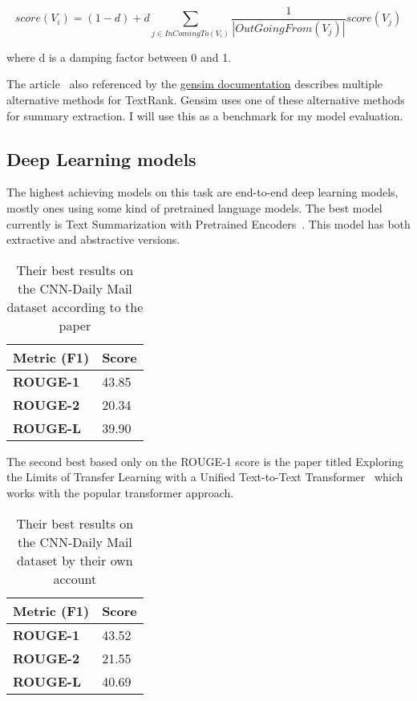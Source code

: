 \[score(V_i) = (1 - d) + d \sum_{j \in InComingTo(V_i)} \frac{1}{|OutGoingFrom(V_j)|} score(V_j)\]

where d is a damping factor between 0 and 1.

The article~\cite{TextRank} also referenced by the \href{https://radimrehurek.com/gensim/summarization/summariser.html}{gensim documentation} describes multiple alternative methods for TextRank. Gensim uses one of these alternative methods for summary extraction.
I will use this as a benchmark for my model evaluation.
\FloatBarrier

\subsection{Deep Learning models}

The highest achieving models on this task are end-to-end deep learning models, mostly ones using some kind of pretrained language models.
The best model currently is Text Summarization with Pretrained Encoders~\cite{BERTsum}. This model has both extractive and abstractive versions.

\begin{table}[!ht]
	\centering
	\begin{tabular}{| l | l |}
		\hline 
		\textbf{Metric (F1)}&\textbf{Score} \\ \hline \hline
		\textbf{ROUGE-1}&43.85 \\ \hline
		\textbf{ROUGE-2}&20.34 \\ \hline
		\textbf{ROUGE-L}&39.90 \\ \hline
	\end{tabular}
	\caption{Their best results on the CNN-Daily Mail dataset according to the paper}
\end{table}
\FloatBarrier

The second best based only on the ROUGE-1 score is the paper titled Exploring the Limits of Transfer Learning with a Unified Text-to-Text Transformer~\cite{TransferSum} which works with the popular transformer approach.

\begin{table}[!ht]
	\centering
	\begin{tabular}{| l | l |}
		\hline 
		\textbf{Metric (F1)}&\textbf{Score} \\ \hline \hline
		\textbf{ROUGE-1}&43.52 \\ \hline
		\textbf{ROUGE-2}&21.55 \\ \hline
		\textbf{ROUGE-L}&40.69 \\ \hline
	\end{tabular}
	\caption{Their best results on the CNN-Daily Mail dataset by their own account}
\end{table}
\FloatBarrier

